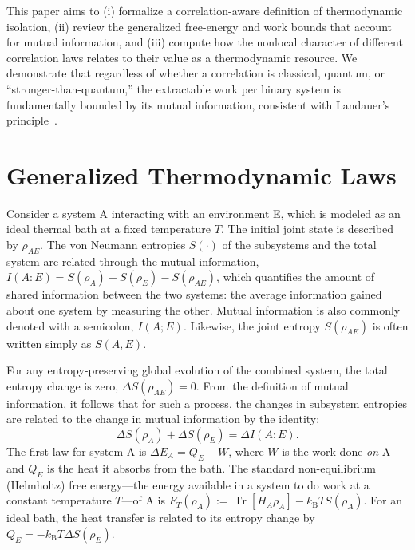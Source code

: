 \documentclass[%
  reprint,
  showpacs,
  showkeys,
  pra,
  longbibliography,
  floatfix,
  x11names
]{revtex4-2}
\begin{document}
This paper aims to (i) formalize a correlation-aware definition of thermodynamic isolation, (ii) review the generalized free-energy and work bounds that account for mutual information, and (iii) compute how the nonlocal character of different correlation laws relates to their value as a thermodynamic resource. We demonstrate that regardless of whether a correlation is classical, quantum, or ``stronger-than-quantum,'' the extractable work per binary system is fundamentally bounded by its mutual information, consistent with Landauer's principle~\cite{landauer:61,Berut2012,Hong2016,Gaudenzi2018,Yan2018,Gyarfas2023,Aimet2025}.

\section{Generalized Thermodynamic Laws}
Consider a system A interacting with an environment E, which is modeled as an ideal thermal bath at a fixed temperature $T$. The initial joint state is described by $\rho_{AE}$. The von Neumann entropies $S(\cdot)$ of the subsystems and the total system are related through the mutual information, $I(A:E)=S(\rho_A)+S(\rho_E)-S(\rho_{AE})$, which quantifies the amount of shared information between the two systems: the average information gained about one system by measuring the other. Mutual information is also commonly denoted with a semicolon, $I(A;E)$. Likewise, the joint entropy $S(\rho_{AE})$ is often written simply as $S(A,E)$.

For any entropy-preserving global evolution of the combined system, the total entropy change is zero, $\Delta S(\rho_{AE})=0$. From the definition of mutual information, it follows that for such a process, the changes in subsystem entropies are related to the change in mutual information by the identity:
\begin{equation}
\Delta S(\rho_A) + \Delta S(\rho_E) = \Delta I(A:E).
\label{eq:global_entropy}
\end{equation}
The first law for system A is $\Delta E_A = Q_E + W$, where $W$ is the work done \emph{on} A and $Q_E$ is the heat it absorbs from the bath. The standard non-equilibrium  (Helmholtz) free energy---the energy available in a system to do work at a constant temperature $T$---of A is $F_T(\rho_A) := \operatorname{Tr}[H_A \rho_A] - k_{\mathrm{B}} T S(\rho_A)$. For an ideal bath, the heat transfer is related to its entropy change by $Q_E = -k_{\mathrm{B}}T \Delta S(\rho_E)$.
\end{document}
